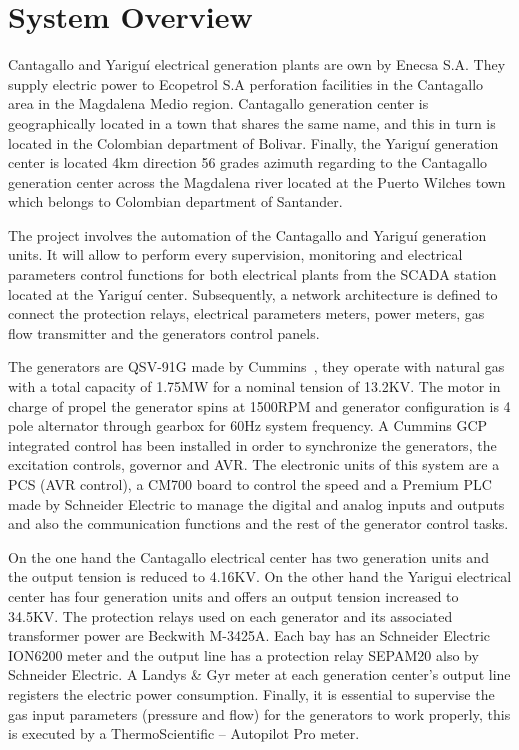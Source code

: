 
\section{System Overview}

Cantagallo and Yariguí electrical generation plants are own by Enecsa S.A.
They supply electric power to Ecopetrol S.A perforation facilities in the
Cantagallo area in the Magdalena Medio region. Cantagallo generation
center is geographically located in a town that shares the same name, and this
in turn is located in the Colombian department of Bolivar. Finally, the Yariguí
generation center is located 4km direction 56 grades azimuth regarding to
the Cantagallo generation center across the Magdalena river located at the
Puerto Wilches town which belongs to Colombian department of Santander.

The project involves the automation of the Cantagallo and Yariguí
generation units. It will allow to perform every supervision,
monitoring and electrical parameters control functions for both
electrical plants from the SCADA station located at the Yariguí
center. Subsequently, a network architecture is defined to connect the
protection relays, electrical parameters meters, power meters, gas
flow transmitter and the generators control panels.

The generators are QSV-91G made by Cummins~\cite{cummins:2005}, they operate 
with natural gas with a total capacity of 1.75MW for a nominal tension 
of 13.2KV. The motor in charge of propel the generator spins at 1500RPM and 
generator configuration is 4 pole alternator through gearbox for 60Hz
system frequency. A Cummins GCP integrated control has been installed 
in order to synchronize the generators, the excitation controls, governor 
and AVR. The electronic units of this system are a PCS (AVR control), a CM700
board to control the speed and a Premium PLC made by Schneider Electric
to manage the digital and analog inputs and outputs and also the
communication functions and the rest of the generator control tasks.

On the one hand the Cantagallo electrical center has two generation
units and the output tension is reduced to 4.16KV. On the other hand
the Yarigui electrical center has four generation units and offers
an output tension increased to 34.5KV. The protection relays used on
each generator and its associated transformer power are Beckwith
M-3425A. Each bay has an Schneider Electric ION6200 meter
and the output line has a protection relay SEPAM20 also by Schneider
Electric. A Landys \& Gyr meter at each generation center's output
line registers the electric power consumption. Finally, it is
essential to supervise the gas input parameters (pressure and flow)
for the generators to work properly, this is executed by a
ThermoScientific – Autopilot Pro meter.

